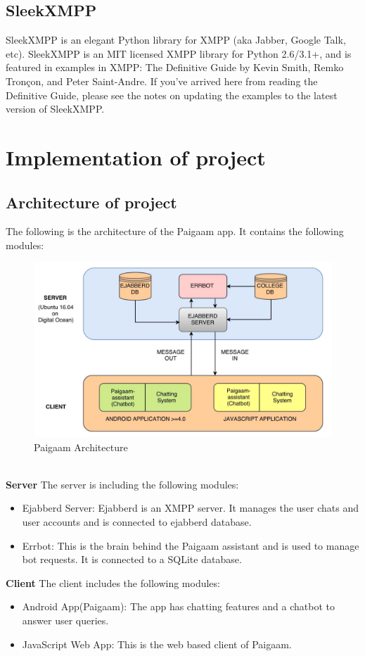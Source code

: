 \subsection{SleekXMPP}
SleekXMPP is an elegant Python library for XMPP (aka Jabber, Google Talk, etc). SleekXMPP is an MIT licensed XMPP library for Python 2.6/3.1+, and is featured in examples in XMPP: The Definitive Guide
by Kevin Smith, Remko Tronçon, and Peter Saint-Andre. If you’ve arrived here from reading the Definitive
Guide, please see the notes on updating the examples to the latest version of SleekXMPP.

\section{Implementation of project}
\subsection{Architecture of project}
The following is the architecture of the Paigaam app. It contains the following modules:
\begin{figure}[ht]
\centering
\includegraphics[scale=0.3]{input/images/im.png}
\caption{Paigaam Architecture}
\end{figure}\\
\noindent \textbf{Server}
The server is including the following modules:
\begin{itemize}
\item Ejabberd Server: Ejabberd is an XMPP server. It manages the user chats and user accounts and is
connected to ejabberd database.
\item Errbot: This is the brain behind the Paigaam assistant and is used to manage bot requests. It is
connected to a SQLite database.
\end{itemize}
\noindent \textbf{Client}
The client includes the following modules:
\begin{itemize}
\item Android App(Paigaam): The app has chatting features and a chatbot to answer user queries.
\item JavaScript Web App: This is the web based client of Paigaam.
\end{itemize}
